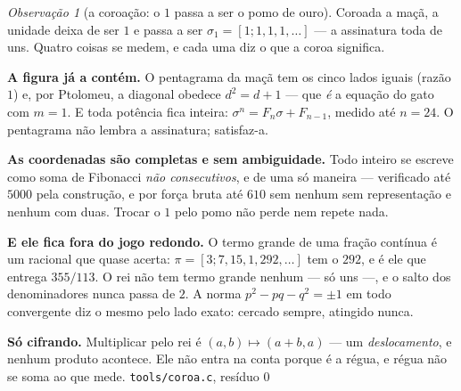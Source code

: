 \documentclass[11pt]{article}
\newcommand{\code}[1]{\texttt{\small #1}}
\theoremstyle{plain}
\theoremstyle{remark}
\newtheorem{obs}{Observação}
\begin{document}
\begin{obs}[a coroação: o $1$ passa a ser o pomo de ouro]\label{obs:coroa}
Coroada a maçã, a unidade deixa de ser $1$ e passa a ser $\sigma_1=[1;1,1,1,\dots]$ --- a assinatura
toda de uns. Quatro coisas se medem, e cada uma diz o que a coroa significa.

\textbf{A figura já a contém.} O pentagrama da maçã tem os cinco lados iguais (razão $1$) e, por
Ptolomeu, a diagonal obedece $d^2=d+1$ --- que \emph{é} a equação do gato com $m=1$. E toda potência
fica inteira: $\sigma^n=F_n\sigma+F_{n-1}$, medido até $n=24$. O pentagrama não lembra a assinatura;
satisfaz-a.

\textbf{As coordenadas são completas e sem ambiguidade.} Todo inteiro se escreve como soma de
Fibonacci \emph{não consecutivos}, e de uma só maneira --- verificado até $5000$ pela construção, e
por força bruta até $610$ sem nenhum sem representação e nenhum com duas. Trocar o $1$ pelo pomo não
perde nem repete nada.

\textbf{E ele fica fora do jogo redondo.} O termo grande de uma fração contínua é um racional que
quase acerta: $\pi=[3;7,15,1,292,\dots]$ tem o $292$, e é ele que entrega $355/113$. O rei não tem
termo grande nenhum --- só uns ---, e o salto dos denominadores nunca passa de $2$. A norma
$p^2-pq-q^2=\pm1$ em todo convergente diz o mesmo pelo lado exato: cercado sempre, atingido nunca.

\textbf{Só cifrando.} Multiplicar pelo rei é $(a,b)\mapsto(a+b,a)$ --- um \emph{deslocamento}, e
nenhum produto acontece. Ele não entra na conta porque é a régua, e régua não se soma ao que mede.
\hfill{\small\code{tools/coroa.c}, resíduo $0$}
\end{obs}
\end{document}
